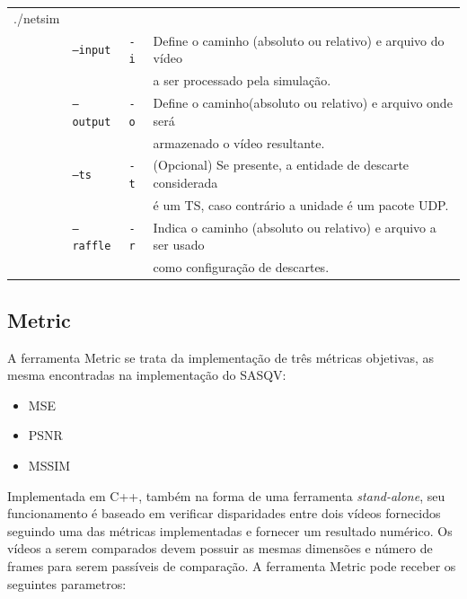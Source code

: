 \begin{table}[!h]
	\begin{tabular}{llll}
	./netsim & & \\
	& \texttt{--input} & \texttt{-i} & Define o caminho (absoluto ou relativo) e arquivo do vídeo \\ 
	& & & a ser processado pela simulação. \\
	& \texttt{--output} & \texttt{-o} & Define o caminho(absoluto ou relativo) e arquivo onde será \\ 
	& & & armazenado o vídeo resultante. \\
	& \texttt{--ts} & \texttt{-t} & (Opcional) Se presente, a entidade de descarte considerada \\
	& & & é um TS, caso contrário a unidade é um pacote UDP. \\
	& \texttt{--raffle} & \texttt{-r} & Indica o caminho (absoluto ou relativo) e arquivo a ser usado \\ 
	& & & como configuração de descartes. \\
	\end{tabular}
\end{table}


\subsection{Metric}
\label{des:metric}

A ferramenta Metric se trata da implementação de três métricas objetivas, as mesma encontradas na implementação do SASQV:

\begin{itemize}
	\item MSE
	\item PSNR
	\item MSSIM
\end{itemize}

Implementada em C++, também na forma de uma ferramenta \emph{stand-alone}, seu funcionamento é baseado em verificar disparidades entre dois vídeos fornecidos seguindo uma das métricas implementadas e fornecer um resultado numérico. 
Os vídeos a serem comparados devem possuir as mesmas dimensões e número de frames para serem passíveis de comparação. 
A ferramenta Metric pode receber os seguintes parametros:

